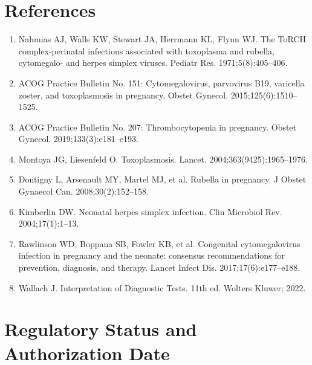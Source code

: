 \section*{References}
\begin{enumerate}
  \item Nahmias AJ, Walls KW, Stewart JA, Herrmann KL, Flynn WJ. The ToRCH complex-perinatal infections associated with toxoplasma and rubella, cytomegalo- and herpes simplex viruses. Pediatr Res. 1971;5(8):405--406.
  \item ACOG Practice Bulletin No. 151: Cytomegalovirus, parvovirus B19, varicella zoster, and toxoplasmosis in pregnancy. Obstet Gynecol. 2015;125(6):1510--1525.
  \item ACOG Practice Bulletin No. 207: Thrombocytopenia in pregnancy. Obstet Gynecol. 2019;133(3):e181--e193.
  \item Montoya JG, Liesenfeld O. Toxoplasmosis. Lancet. 2004;363(9425):1965--1976.
  \item Dontigny L, Arsenault MY, Martel MJ, et al. Rubella in pregnancy. J Obstet Gynaecol Can. 2008;30(2):152--158.
  \item Kimberlin DW. Neonatal herpes simplex infection. Clin Microbiol Rev. 2004;17(1):1--13.
  \item Rawlinson WD, Boppana SB, Fowler KB, et al. Congenital cytomegalovirus infection in pregnancy and the neonate: consensus recommendations for prevention, diagnosis, and therapy. Lancet Infect Dis. 2017;17(6):e177--e188.
  \item Wallach J. Interpretation of Diagnostic Tests. 11th ed. Wolters Kluwer; 2022.
\end{enumerate}

\clearpage
\section*{Regulatory Status and Authorization Date}

\clearpage
